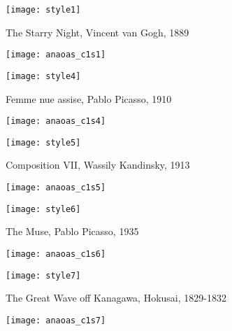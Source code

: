\begin{figure}[H]
	\centering
    \begin{subfigure}[b]{0.5\textwidth}
		\centering
        \texttt{[image: style1]}
        \label{fig:anaoas_style1}
        \caption{The Starry Night, Vincent van Gogh, 1889}
	\end{subfigure}
    \hfill
    \begin{subfigure}[b]{0.4\textwidth}
		\centering
        \texttt{[image: anaoas\_c1s1]}
        \label{fig:anaoas_c1s1}
	\end{subfigure}
    \begin{subfigure}[b]{0.5\textwidth}
		\centering
        \texttt{[image: style4]}
        \label{fig:anaoas_style4}
        \caption{Femme nue assise, Pablo Picasso, 1910}
	\end{subfigure}
    \hfill
    \begin{subfigure}[b]{0.4\textwidth}
		\centering
        \texttt{[image: anaoas\_c1s4]}
        \label{fig:anaoas_c1s4}
	\end{subfigure}
    \begin{subfigure}[b]{0.5\textwidth}
		\centering
        \texttt{[image: style5]}
        \label{fig:anaoas_style5}
        \caption{Composition VII, Wassily Kandinsky, 1913}
	\end{subfigure}
    \hfill
    \begin{subfigure}[b]{0.4\textwidth}
		\centering
        \texttt{[image: anaoas\_c1s5]}
        \label{fig:anaoas_c1s5}
	\end{subfigure}
    \begin{subfigure}[b]{0.5\textwidth}
		\centering
        \texttt{[image: style6]}
        \label{fig:anaoas_style6}
        \caption{The Muse, Pablo Picasso, 1935}
	\end{subfigure}
    \hfill
    \begin{subfigure}[b]{0.4\textwidth}
		\centering
        \texttt{[image: anaoas\_c1s6]}
        \label{fig:anaoas_c1s6}
	\end{subfigure}
    \begin{subfigure}[b]{0.5\textwidth}
		\centering
        \texttt{[image: style7]}
        \label{fig:anaoas_style7}
        \caption{The Great Wave off Kanagawa, Hokusai, 1829-1832}
	\end{subfigure}
    \hfill
    \begin{subfigure}[b]{0.4\textwidth}
		\centering
        \texttt{[image: anaoas\_c1s7]}
        \label{fig:anaoas_c1s7}
	\end{subfigure}
\end{figure}

